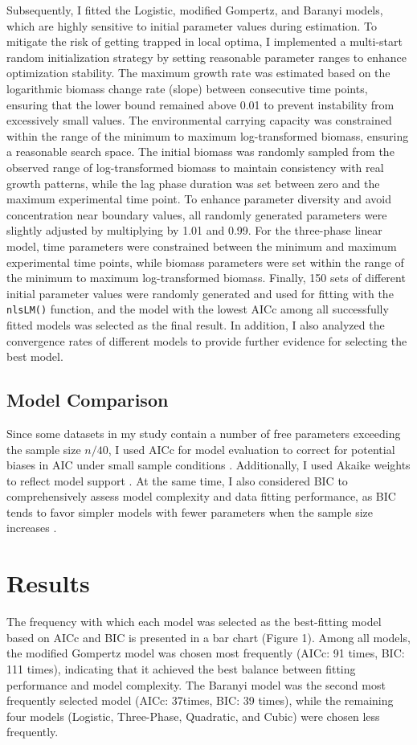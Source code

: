 \documentclass[12pt]{article}
\begin{document}
Subsequently, I fitted the Logistic, modified Gompertz, and Baranyi models, which are highly sensitive to initial parameter values during estimation. To mitigate the risk of getting trapped in local optima, I implemented a multi-start random initialization strategy by setting reasonable parameter ranges to enhance optimization stability. The maximum growth rate was estimated based on the logarithmic biomass change rate (slope) between consecutive time points, ensuring that the lower bound remained above 0.01 to prevent instability from excessively small values. The environmental carrying capacity was constrained within the range of the minimum to maximum log-transformed biomass, ensuring a reasonable search space. The initial biomass was randomly sampled from the observed range of log-transformed biomass to maintain consistency with real growth patterns, while the lag phase duration was set between zero and the maximum experimental time point. To enhance parameter diversity and avoid concentration near boundary values, all randomly generated parameters were slightly adjusted by multiplying by 1.01 and 0.99. For the three-phase linear model, time parameters were constrained between the minimum and maximum experimental time points, while biomass parameters were set within the range of the minimum to maximum log-transformed biomass. Finally, 150 sets of different initial parameter values were randomly generated and used for fitting with the \texttt{nlsLM()} function, and the model with the lowest AICc among all successfully fitted models was selected as the final result. In addition, I also analyzed the convergence rates of different models to provide further evidence for selecting the best model.

\subsection{Model Comparison}
Since some datasets in my study contain a number of free parameters exceeding the sample size $n/40$, I used AICc for model evaluation to correct for potential biases in AIC under small sample conditions \citep{JohnsonOmland2004}. Additionally, I used Akaike weights to reflect model support . At the same time, I also considered BIC to comprehensively assess model complexity and data fitting performance, as BIC tends to favor simpler models with fewer parameters when the sample size increases \citep{Ward2008}.

\section{Results}
The frequency with which each model was selected as the best-fitting model based on AICc and BIC is presented in a bar chart (Figure 1). Among all models, the modified Gompertz model was chosen most frequently (AICc: 91 times, BIC: 111 times), indicating that it achieved the best balance between fitting performance and model complexity. The Baranyi model was the second most frequently selected model (AICc: 37times, BIC: 39 times), while the remaining four models (Logistic, Three-Phase, Quadratic, and Cubic) were chosen less frequently.
\end{document}
